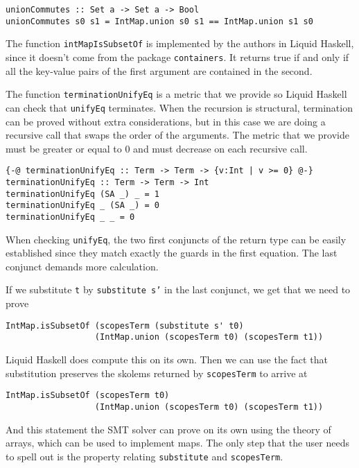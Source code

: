 \documentclass[acmtog, anonymous]{acmart}
\newcommand{\tc}[1]{{\small\texttt{#1}}}
\begin{document}
\begin{verbatim}
unionCommutes :: Set a -> Set a -> Bool
unionCommutes s0 s1 = IntMap.union s0 s1 == IntMap.union s1 s0
\end{verbatim}

The function \tc{intMapIsSubsetOf} is implemented by the authors in Liquid
Haskell, since it doesn't come from the package \tc{containers}. It returns
true if and only if all the key-value pairs of the first argument are contained
in the second.

The function \tc{terminationUnifyEq} is a metric that we provide so Liquid
Haskell can check that \tc{unifyEq} terminates. When the recursion is
structural, termination can be proved without extra considerations, but in
this case we are doing a recursive call that swaps the order of the arguments.
The metric that we provide must be greater or equal to 0 and must decrease on
each recursive call.

\begin{verbatim}
{-@ terminationUnifyEq :: Term -> Term -> {v:Int | v >= 0} @-}
terminationUnifyEq :: Term -> Term -> Int
terminationUnifyEq (SA _) _ = 1
terminationUnifyEq _ (SA _) = 0
terminationUnifyEq _ _ = 0
\end{verbatim}

When checking \tc{unifyEq}, the two first conjuncts of the return type can
be easily established since they match exactly the guards in the first equation.
The last conjunct demands more calculation.

If we substitute \tc{t} by \tc{substitute s'} in the last conjunct, we get that we
need to prove

\begin{verbatim}
IntMap.isSubsetOf (scopesTerm (substitute s' t0)
                  (IntMap.union (scopesTerm t0) (scopesTerm t1))
\end{verbatim}

Liquid Haskell does compute this on its own. Then we can use the fact that substitution
preserves the skolems returned by \tc{scopesTerm} to arrive at

\begin{verbatim}
IntMap.isSubsetOf (scopesTerm t0)
                  (IntMap.union (scopesTerm t0) (scopesTerm t1))
\end{verbatim}

And this statement the SMT solver can prove on its own using the theory of arrays,
which can be used to implement maps. The only step that the user needs to spell out
is the property relating \tc{substitute} and \tc{scopesTerm}.
\end{document}

